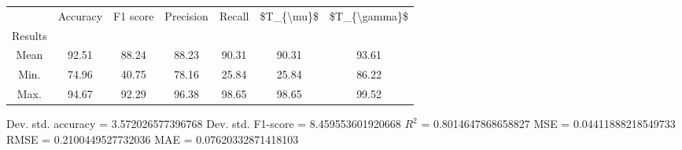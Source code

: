 \begin{tabular}{|c|c|c|c|c|c|c|}
\toprule
{} &  Accuracy &  F1 score &  Precision &  Recall &  \$T\_\{\textbackslash mu\}\$ &  \$T\_\{\textbackslash gamma\}\$ \\
Results &           &           &            &         &            &               \\
\hline
Mean    &     92.51 &     88.24 &      88.23 &   90.31 &      90.31 &         93.61 \\
Min.    &     74.96 &     40.75 &      78.16 &   25.84 &      25.84 &         86.22 \\
Max.    &     94.67 &     92.29 &      96.38 &   98.65 &      98.65 &         99.52 \\
\bottomrule
\end{tabular}

 Dev. std. accuracy = 3.572026577396768
 Dev. std. F1-score = 8.459553601920668
 $R^2$ = 0.8014647868658827
 MSE = 0.04411888218549733
 RMSE = 0.2100449527732036
 MAE = 0.07620332871418103